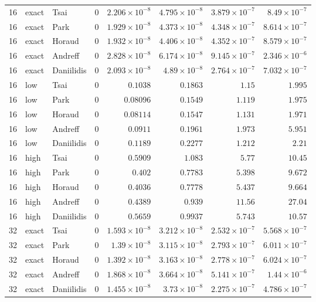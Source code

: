 \begin{longtable}{rllrrrrr}
16 & exact & Tsai & 0 & $2.206\times10^{-8}$ & $4.795\times10^{-8}$ & $3.879\times10^{-7}$ & $8.49\times10^{-7}$ \\
16 & exact & Park & 0 & $1.929\times10^{-8}$ & $4.373\times10^{-8}$ & $4.348\times10^{-7}$ & $8.614\times10^{-7}$ \\
16 & exact & Horaud & 0 & $1.932\times10^{-8}$ & $4.406\times10^{-8}$ & $4.352\times10^{-7}$ & $8.579\times10^{-7}$ \\
16 & exact & Andreff & 0 & $2.828\times10^{-8}$ & $6.174\times10^{-8}$ & $9.145\times10^{-7}$ & $2.346\times10^{-6}$ \\
16 & exact & Daniilidis & 0 & $2.093\times10^{-8}$ & $4.89\times10^{-8}$ & $2.764\times10^{-7}$ & $7.032\times10^{-7}$ \\
16 & low & Tsai & 0 & $0.1038$ & $0.1863$ & $1.15$ & $1.995$ \\
16 & low & Park & 0 & $0.08096$ & $0.1549$ & $1.119$ & $1.975$ \\
16 & low & Horaud & 0 & $0.08114$ & $0.1547$ & $1.131$ & $1.971$ \\
16 & low & Andreff & 0 & $0.0911$ & $0.1961$ & $1.973$ & $5.951$ \\
16 & low & Daniilidis & 0 & $0.1189$ & $0.2277$ & $1.212$ & $2.21$ \\
16 & high & Tsai & 0 & $0.5909$ & $1.083$ & $5.77$ & $10.45$ \\
16 & high & Park & 0 & $0.402$ & $0.7783$ & $5.398$ & $9.672$ \\
16 & high & Horaud & 0 & $0.4036$ & $0.7778$ & $5.437$ & $9.664$ \\
16 & high & Andreff & 0 & $0.4389$ & $0.939$ & $11.56$ & $27.04$ \\
16 & high & Daniilidis & 0 & $0.5659$ & $0.9937$ & $5.743$ & $10.57$ \\
32 & exact & Tsai & 0 & $1.593\times10^{-8}$ & $3.212\times10^{-8}$ & $2.532\times10^{-7}$ & $5.568\times10^{-7}$ \\
32 & exact & Park & 0 & $1.39\times10^{-8}$ & $3.115\times10^{-8}$ & $2.793\times10^{-7}$ & $6.011\times10^{-7}$ \\
32 & exact & Horaud & 0 & $1.392\times10^{-8}$ & $3.163\times10^{-8}$ & $2.778\times10^{-7}$ & $6.024\times10^{-7}$ \\
32 & exact & Andreff & 0 & $1.868\times10^{-8}$ & $3.664\times10^{-8}$ & $5.141\times10^{-7}$ & $1.44\times10^{-6}$ \\
32 & exact & Daniilidis & 0 & $1.455\times10^{-8}$ & $3.73\times10^{-8}$ & $2.275\times10^{-7}$ & $4.786\times10^{-7}$ \\

\end{longtable}
